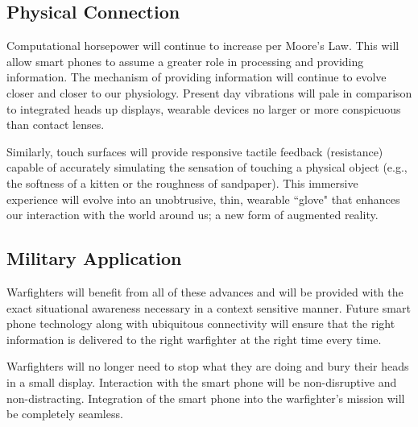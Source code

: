 \documentclass[letterpaper,12pt]{article}
\begin{document}
\subsection*{Physical Connection}
Computational horsepower will continue to increase per Moore's Law.  This will allow smart phones to assume a greater role in processing and providing information.  The mechanism of providing information will continue to evolve closer and closer to our physiology.  Present day vibrations will pale in comparison to integrated heads up displays, wearable devices no larger or more conspicuous than contact lenses.

Similarly, touch surfaces will provide responsive tactile feedback (resistance) capable of accurately simulating the sensation of touching a physical object (e.g., the softness of a kitten or the roughness of sandpaper).  This immersive experience will evolve into an unobtrusive, thin, wearable ``glove" that enhances our interaction with the world around us; a new form of augmented reality.

\subsection*{Military Application}
Warfighters will benefit from all of these advances and will be provided with the exact situational awareness necessary in a context sensitive manner.  Future smart phone technology along with ubiquitous connectivity will ensure that the right information is delivered to the right warfighter at the right time every time.

Warfighters will no longer need to stop what they are doing and bury their heads in a small display.  Interaction with the smart phone will be non-disruptive and non-distracting.  Integration of the smart phone into the warfighter's mission will be completely seamless.
\end{document}
